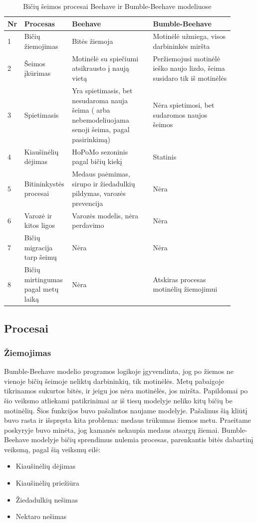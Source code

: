 \documentclass{VUMIFKompMagistrinis}
\begin{document}
\begin{table}[H]\footnotesize
  \centering
  \caption{Bičių šeimos procesai Beehave ir Bumble-Beehave modeliuose}
  \label{tab:proc}
  \begin{tabular}{p{0.05\linewidth}p{0.15\linewidth}p{0.35\linewidth}p{0.35\linewidth}} \hline
    Nr & Procesas & Beehave & Bumble-Beehave \\
    \hline
    1 &	Bičių žiemojimas &	Bitės žiemoja &	Motinėlė užmiega, visos darbininkės miršta \\
    \hline
2 &	Šeimos įkūrimas	& Motinėlė su spiečiumi atsikrausto į naują vietą &	Peržiemojusi motinėlė ieško naujo lizdo, šeima susidaro tik iš motinėlės \\
\hline
3 &	Spietimasis &	Yra spietimasis, bet nesudaroma nauja šeima ( arba nebemodeliuojama senoji šeima, pagal pasirinkimą) &	Nėra spietimosi, bet sudaromos naujos šeimos \\
\hline
4 &	Kiaušinėlių dėjimas &	HoPoMo \cite{ScC07} sezoninis pagal bičių kiekį &	Statinis \\
\hline
5 &	Bitininkystės procesai &	Medaus paėmimas, sirupo ir žiedadulkių pildymas, varozės prevencija &	Nėra \\
\hline
6 &	Varozė ir kitos ligos &	Varozės modelis, nėra perdavimo &	Nėra \\
\hline
7 &	Bičių migracija tarp šeimų &	Nėra &	Nėra \\
\hline
8 &	Bičių mirtingumas pagal metų laiką & 	Nėra &	Atskiras procesas motinėlių žiemojimui \\
    \hline
  \end{tabular}

\end{table}









\subsection{Procesai}
\subsubsection{Žiemojimas}
Bumble-Beehave modelio programos logikoje įgyvendinta, jog po žiemos ne vienoje bičių šeimoje neliktų darbininkių, tik motinėlės. Metų pabaigoje tikrinamos sukurtos bitės, ir jeigu jos nėra motinėlės, jos miršta. Papildomai po šio veiksmo atliekami patikrinimai ar iš tiesų modelyje neliko kitų bičių be motinėlių. Šios funkcijos buvo pašalintos naujame modelyje.
Pašalinus šią kliūtį buvo rasta ir išspręsta kita problema: medaus trūkumas žiemos metu. Praeitame poskyryje buvo minėta, jog kamanės nekaupia medaus atsargų žiemai. Bumble-Beehave modelyje bičių sprendimus nulemia procesas, parenkantis bitės dabartinį veiksmą, pagal šią veiksmų eilė:
\begin{itemize}
\item Kiaušinėlių dėjimas
\item Kiaušinėlių priežiūra
\item Žiedadulkių nešimas
\item Nektaro nešimas
\end{itemize}{}
\end{document}
